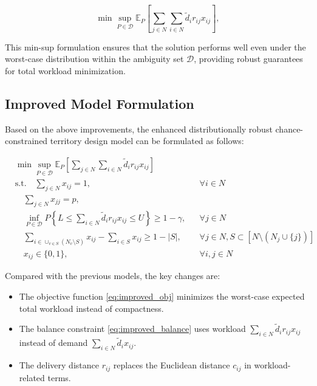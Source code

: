 \documentclass[preprint,12pt,authoryear]{elsarticle}
\begin{document}
\begin{equation}
\min \sup_{P \in \mathcal{D}} \mathbb{E}_P\left[\sum_{j \in N} \sum_{i \in N} \widetilde{d}_i r_{ij} x_{ij}\right],
\end{equation}

This min-sup formulation ensures that the solution performs well even under the worst-case distribution within the ambiguity set $\mathcal{D}$, providing robust guarantees for total workload minimization.

\subsection{Improved Model Formulation}

Based on the above improvements, the enhanced distributionally robust chance-constrained territory design model can be formulated as follows:

\begin{align}
&\min \sup_{P \in \mathcal{D}} \mathbb{E}_P\left[\sum_{j \in N} \sum_{i \in N} \widetilde{d}_i r_{ij} x_{ij}\right] \label{eq:improved_obj} \\
&\text{s.t.} \quad \sum_{j \in N} x_{ij} = 1, && \forall i \in N \label{eq:improved_assign} \\
&\quad \sum_{j \in N} x_{jj} = p, \label{eq:improved_districts} \\
&\quad \inf_{P \in \mathcal{D}} P\left\{ L \leqslant \sum_{i \in N} \widetilde{d}_i r_{ij} x_{ij} \leqslant U \right\} \geqslant 1 - \gamma, && \forall j \in N \label{eq:improved_balance} \\
&\quad \sum_{i \in \cup_{v\in S}(N_v\setminus S)} x_{ij} - \sum_{i \in S} x_{ij} \geqslant 1 - |S|, && \forall j \in N, S \subset [N \setminus (N_j \cup \{j\})] \label{eq:improved_connectivity} \\
&\quad x_{ij} \in \{0,1\}, && \forall i,j \in N \label{eq:improved_binary}
\end{align}

Compared with the previous models, the key changes are:
\begin{itemize}
    \item The objective function \eqref{eq:improved_obj} minimizes the worst-case expected total workload instead of compactness.
    \item The balance constraint \eqref{eq:improved_balance} uses workload $\sum_{i \in N} \widetilde{d}_i r_{ij} x_{ij}$ instead of demand $\sum_{i \in N} \widetilde{d}_i x_{ij}$.
    \item The delivery distance $r_{ij}$ replaces the Euclidean distance $c_{ij}$ in workload-related terms.
\end{itemize}
\end{document}
